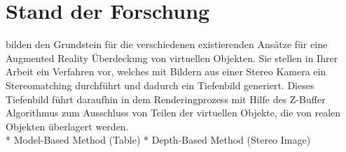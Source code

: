 \section{Stand der Forschung}

\citet{wloka1995resolving} bilden den Grundstein für die verschiedenen existierenden Ansätze für eine Augmented Reality Überdeckung von virtuellen Objekten. Sie stellen in Ihrer Arbeit ein Verfahren vor, welches mit Bildern aus einer Stereo Kamera ein Stereomatching durchführt und dadurch ein Tiefenbild generiert. Dieses Tiefenbild führt daraufhin in dem Renderingprozess mit Hilfe des Z-Buffer Algorithmus zum Ausschluss von Teilen der virtuellen Objekte, die von realen Objekten überlagert werden. \\




* Model-Based Method (Table) 
* Depth-Based Method (Stereo Image) 


